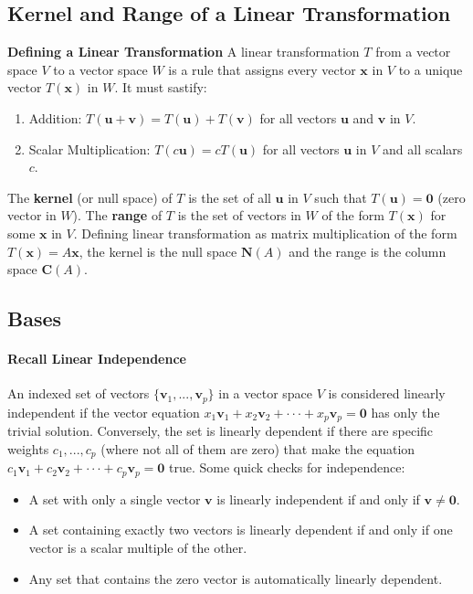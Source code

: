 \documentclass[../linear-algebra.tex]{subfiles}
\begin{document}
\subsection{Kernel and Range of a Linear Transformation}
\textbf{Defining a Linear Transformation}
A linear transformation $T$ from a vector space $V$ to a vector space $W$ is a rule
that assigns every vector $\mathbf{x}$ in $V$ to a unique vector $T(\mathbf{x})$ in $W$.
It must sastify:
\begin{enumerate}
    \item Addition: $T(\mathbf{u}+\mathbf{v}) = T(\mathbf{u}) + T(\mathbf{v})$ for all vectors $\mathbf{u}$ and $\mathbf{v}$ in $V$.
    \item Scalar Multiplication: $T(c\mathbf{u}) = cT(\mathbf{u})$ for all vectors $\mathbf{u}$ in $V$ and all scalars $c$.
\end{enumerate}

\noindent The \textbf{kernel} (or null space) of $T$ is the set of all $\mathbf{u}$ in $V$ such that $T(\mathbf{u}) = \mathbf{0}$ (zero vector in $W$).\newline
The \textbf{range} of $T$ is the set of vectors in $W$ of the form $T(\mathbf{x})$ for some $\mathbf{x}$ in $V$.\newline
Defining linear transformation as matrix multiplication of the form $T(\mathbf{x}) = A\mathbf{x}$,
the kernel is the null space $\mathbf{N}(A)$ and the range is the column space $\mathbf{C}(A)$.

\subsection{Bases}
\paragraph{Recall Linear Independence} An indexed set of vectors $\{\mathbf{v}_{1},...,\mathbf{v}_{p}\}$ in a vector space $V$ is considered linearly independent if the vector equation $x_{1}\mathbf{v}_{1}+x_{2}\mathbf{v}_{2}+\cdot\cdot\cdot+x_{p}\mathbf{v}_{p}=\mathbf{0}$ has only the trivial solution.\newline
Conversely, the set is linearly dependent if there are specific weights $c_{1},...,c_{p}$ (where not all of them are zero) that make the equation $c_{1}\mathbf{v}_{1}+c_{2}\mathbf{v}_{2}+\cdot\cdot\cdot+c_{p}\mathbf{v}_{p}=\mathbf{0}$ true.\newline
Some quick checks for independence:
\begin{itemize}
    \item A set with only a single vector $\mathbf{v}$ is linearly independent if and only if $\mathbf{v}\ne\mathbf{0}$.
    \item A set containing exactly two vectors is linearly dependent if and only if one vector is a scalar multiple of the other.
    \item Any set that contains the zero vector is automatically linearly dependent.
\end{itemize}
\end{document}

